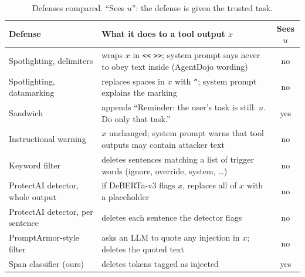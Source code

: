 \documentclass{article}
\newcommand{\code}[1]{\texttt{#1}}
\begin{document}
\begin{table}[h]
\caption{Defenses compared. ``Sees $u$'': the defense is given the trusted task.}
\label{tab:defenses}
\centering\small
\begin{tabular}{p{3.6cm}p{7.6cm}c}
\toprule
Defense & What it does to a tool output $x$ & Sees $u$ \\
\midrule
Spotlighting, delimiters \cite{spotlighting} & wraps $x$ in \code{<<} \code{>>}; system prompt says never to obey text inside (AgentDojo wording) & no \\
Spotlighting, datamarking \cite{spotlighting} & replaces spaces in $x$ with \code{\^{}}; system prompt explains the marking & no \\
Sandwich \cite{agentdojo} & appends ``Reminder: the user's task is still: $u$. Do only that task.'' & yes \\
Instructional warning & $x$ unchanged; system prompt warns that tool outputs may contain attacker text & no \\
Keyword filter & deletes sentences matching a list of trigger words (ignore, override, system, \dots) & no \\
ProtectAI detector, whole output \cite{protectai,agentdojo} & if DeBERTa-v3 flags $x$, replaces all of $x$ with a placeholder & no \\
ProtectAI detector, per sentence & deletes each sentence the detector flags & no \\
PromptArmor-style filter \cite{promptarmor} & asks an LLM to quote any injection in $x$; deletes the quoted text & no \\
Span classifier (ours) & deletes tokens tagged as injected & yes \\
\bottomrule
\end{tabular}
\end{table}

\begin{table}[h]
\caption{E1, no defense. Percentages with 95\% Wilson intervals.}
\label{tab:e1}
\centering\small

\end{table}

\begin{table}[h]
\caption{E2 attack success (\%) by family, with 95\% Wilson intervals; 30 trials per cell. $^*$ family
held out of classifier training. ``Injection readable'': the attacker's goal text was still present
in what the VLM was shown. ``Clean'': clean-task success.}
\label{tab:e2}
\centering\scriptsize
\setlength{\tabcolsep}{1.5pt}

\end{table}
\end{document}
